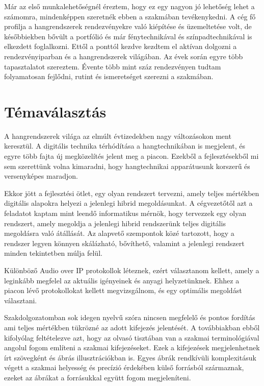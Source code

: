 Már az első munkalehetőségnél éreztem, hogy ez egy nagyon jó lehetőség lehet a számomra, mindenképpen szeretnék ebben a szakmában tevékenykedni.
A cég fő profilja a hangrendszerek rendezvényekre való kiépítése és üzemeltetése volt, de későbbiekben bővült a portfólió és már fénytechnikával és színpadtechnikával is elkezdett foglalkozni. 
Ettől a ponttól kezdve kezdtem el aktívan dolgozni a rendezvényiparban és a hangrendszerek világában. Az évek során egyre több tapasztalatot szereztem.
Évente több mint száz rendezvényen tudtam folyamatosan fejlődni, rutint és ismeretséget szerezni a szakmában.
\section{Témaválasztás}
A hangrendszerek világa az elmúlt évtizedekben nagy változásokon ment keresztül.
A digitális technika térhódítása a hangtechnikában is megjelent, és egyre több fajta új megközelítés jelent meg a piacon.
Ezekből a fejlesztésekből mi sem szerettünk volna kimaradni, hogy hangtechnikai apparátusunk korszerű és versenyképes maradjon.

Ekkor jött a fejlesztési ötlet, egy olyan rendszert tervezni, amely teljes mértékben digitális alapokra helyezi a jelenlegi hibrid megoldásunkat.
A cégvezetőtől azt a feladatot kaptam mint leendő informatikus mérnök, hogy tervezzek egy olyan rendszert,
amely megoldja a jelenlegi hibrid rendszerünk teljes digitális megoldásra való átállását.
Az alapvető szempontok közé tartozott, hogy a rendszer legyen könnyen skálázható, bővíthető, valamint a jelenlegi rendszert minden tekintetben múlja felül.

Különböző Audio over IP protokollok léteznek, ezért választanom kellett, amely a leginkább megfelel az aktuális igényeinek és anyagi helyzetünknek.
Ehhez a piacon lévő protokollokat kellett megvizsgálnom, és egy optimális megoldást választani.

Szakdolgozatomban sok idegen nyelvű szóra nincsen megfelelő és pontos fordítás ami teljes mértékben tükrözné az adott kifejezés jelentését.
A továbbiakban ebből kifolyólag feltételezve azt, hogy az olvasó tisztában van a szakmai terminológiával angolul fogom említeni a szakmai kifejezéseket.
Ezek a kifejezések megjelenhetnek írt szövegként és ábrás illusztrációkban is. Egyes ábrák rendkívüli komplexitásuk végett a szakmai helyesség és precízió érdekében
külső forrásból származnak, ezeket az ábrákat a forrásukkal együtt fogom megjeleníteni.
